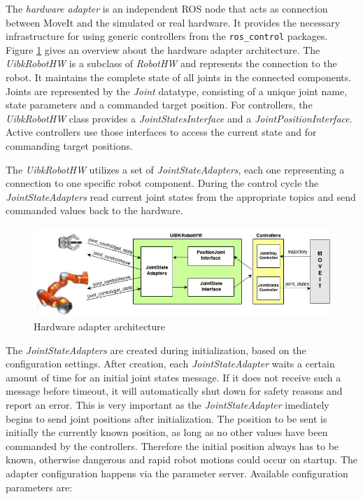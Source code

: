 The \emph{hardware adapter} is an independent ROS node that acts as connection between MoveIt and the simulated or real hardware. It provides the necessary infrastructure for using generic controllers from the \texttt{ros\_control} packages. Figure \ref{fig:hardware_adapter} gives an overview about the hardware adapter architecture. The \emph{UibkRobotHW} is a subclass of \emph{RobotHW} and represents the connection to the robot. It maintains the complete state of all joints in the connected components. Joints are represented by the \emph{Joint} datatype, consisting of a unique joint name, state parameters and a commanded target position. For controllers, the \emph{UibkRobotHW} class provides a \emph{JointStatesInterface} and a \emph{JointPositionInterface}. Active controllers use those interfaces to access the current state and for commanding target positions. 

The \emph{UibkRobotHW} utilizes a set of \emph{JointStateAdapters}, each one representing a connection to one specific robot component. During the control cycle the \emph{JointStateAdapters} read current joint states from the appropriate topics and send commanded values back to the hardware.
\begin{figure}[h]
	\centering
  	\includegraphics[width=1.0\textwidth]{images/hardware_adapter.jpg}
	\caption{Hardware adapter architecture}
	\label{fig:hardware_adapter}
\end{figure}
The \emph{JointStateAdapters} are created during initialization, based on the configuration settings. After creation, each \emph{JointStateAdapter} waits a certain amount of time for an initial joint states message. If it does not receive such a message before timeout, it will automatically shut down for safety reasons and report an error. This is very important as the \emph{JointStateAdapter} imediately begins to send joint positions after initialization. The position to be sent is initially the currently known position, as long as no other values have been commanded by the controllers. Therefore the initial position always has to be known, otherwise dangerous and rapid robot motions could occur on startup. The adapter configuration happens via the parameter server. Available configuration parameters are:

